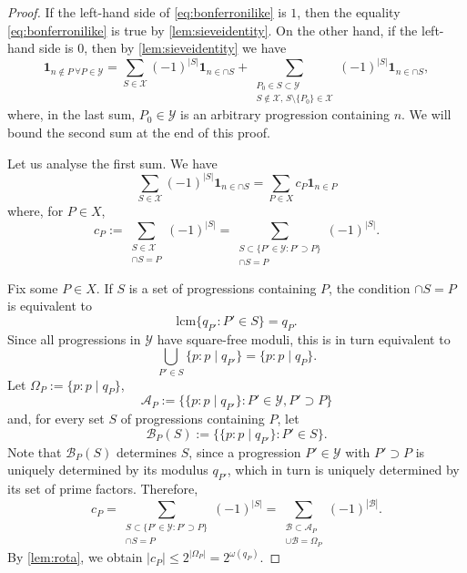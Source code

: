 \documentclass[11pt]{amsart}
\theoremstyle{definition}
\renewcommand{\leq}{\leqslant}
\newcommand{\ind}[1]{\mathbf{1}_{#1}}
\newcommand{\prohibprog}{\mathcal{Y}}
\newcommand{\modulus}{q}
\newcommand{\appendixsubcoll}{\mathcal{X}}
\begin{document}
\begin{proof}
If the left-hand side of \cref{eq:bonferronilike} is $1$, then the equality \cref{eq:bonferronilike} is true by \cref{lem:sieveidentity}. On the other hand, if the left-hand side is $0$, then by \cref{lem:sieveidentity} we have
\begin{equation*}
\ind{n\not\in P\  \forall P\in \prohibprog}  = \sum_{S\in \appendixsubcoll} (-1)^{|S|} \ind{n \in \cap S}  +  \sum_{\substack{P_0\in S \subset \prohibprog\\ S \not\in \appendixsubcoll,\, S\setminus \{P_0\} \in \appendixsubcoll}} (-1)^{|S|} \ind{n\in \cap S},
\end{equation*}
where, in the last sum, $P_0 \in \prohibprog$ is an arbitrary progression containing $n$. We will bound the second sum at the end of this proof.

Let us analyse the first sum. We have
\begin{equation*}
\sum_{S\in \appendixsubcoll} (-1)^{|S|} \ind{n \in \cap S} = \sum_{P\in X } c_{P} \ind{n\in P}
\end{equation*}
where, for $P\in X $,
\begin{equation*}
c_{P} := \sum_{\substack{S\in \appendixsubcoll\\ \cap S = P}} (-1)^{|S|}  = \sum_{\substack{S\subset \{P'\in \prohibprog : P'\supset P\} \\ \cap S = P}} (-1)^{|S|}.
\end{equation*}

Fix some $P\in X$. If $S$ is a set of progressions containing $P$, the condition $\cap S = P$ is equivalent to 
\begin{equation*}
	\mathrm{lcm} \{\modulus_{P'} : P'\in S\} = \modulus_{P}.
\end{equation*}
Since all progressions in $\prohibprog$ have square-free moduli, this is in turn equivalent to
\begin{equation*}
	\bigcup_{P'\in S} \{p : p\mid \modulus_{P'}\} = \{p : p\mid \modulus_{P}\}.
\end{equation*}
Let $\Omega_P := \{p : p\mid \modulus_{P}\}$,
\begin{equation*}
	\mathcal{A}_P := \Big\{ \{p : p\mid \modulus_{P'}\} : P'\in \prohibprog, P'\supset P\Big\}
\end{equation*}
and, for every set $S$ of progressions containing $P$, let 
\begin{equation*}
	\mathcal{B}_{P}(S) := \Big\{ \{p : p\mid \modulus_{P'}\} : P'\in S\Big\}.
\end{equation*}
Note that $\mathcal{B}_P(S)$ determines $S$, since a progression $P'\in \prohibprog$ with $P'\supset P$ is uniquely determined by its modulus $\modulus_{P'}$, which in turn is uniquely determined by its set of prime factors. Therefore,
\begin{equation*}
c_P =  \sum_{\substack{S\subset \{P'\in \prohibprog : P'\supset P\} \\ \cap S = P}} (-1)^{|S|} = \sum_{\substack{\mathcal{B} \subset \mathcal{A}_P \\ \cup \mathcal{B} = \Omega_P}} (-1)^{|\mathcal{B}|}.
\end{equation*}
By \cref{lem:rota}, we obtain $|c_P| \leq 2^{|\Omega_P|} = 2^{\omega(\modulus_{P})}$.


\end{proof}
\end{document}
